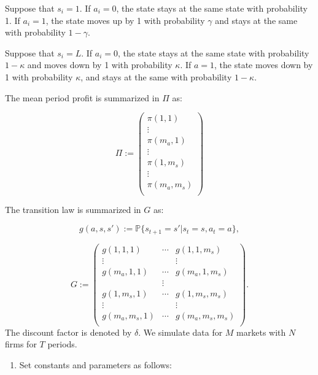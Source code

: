 \documentclass[]{book}
\providecommand{\tightlist}{%
  \setlength{\itemsep}{0pt}\setlength{\parskip}{0pt}}
\begin{document}
Suppose that \(s_i = 1\). If \(a_i = 0\), the state stays at the same
state with probability 1. If \(a_i = 1\), the state moves up by 1 with
probability \(\gamma\) and stays at the same with probability
\(1 - \gamma\).

Suppose that \(s_i = L\). If \(a_i = 0\), the state stays at the same
state with probability \(1 - \kappa\) and moves down by 1 with
probability \(\kappa\). If \(a = 1\), the state moves down by 1 with
probability \(\kappa\), and stays at the same with probability
\(1 - \kappa\).

The mean period profit is summarized in \(\Pi\) as:

\[
\Pi :=
\begin{pmatrix}
\pi(1, 1)\\
\vdots\\
\pi(m_a, 1)\\
\vdots \\
\pi(1, m_s)\\
\vdots\\
\pi(m_a, m_s)\\
\end{pmatrix}
\]

The transition law is summarized in \(G\) as:

\[
g(a, s, s') := \mathbb{P}\{s_{t + 1} = s'|s_t = s, a_t = a\},
\]

\[
G := 
\begin{pmatrix}
g(1, 1, 1) & \cdots & g(1, 1, m_s)\\
\vdots & & \vdots \\
g(m_a, 1, 1) & \cdots & g(m_a, 1, m_s)\\
& \vdots & \\
g(1, m_s, 1) & \cdots & g(1, m_s, m_s)\\
\vdots & & \vdots \\
g(m_a, m_s, 1) & \cdots & g(m_a, m_s, m_s)\\
\end{pmatrix}.
\] The discount factor is denoted by \(\delta\). We simulate data for
\(M\) markets with \(N\) firms for \(T\) periods.

\begin{enumerate}
\def\labelenumi{\arabic{enumi}.}
\tightlist
\item
  Set constants and parameters as follows:
\end{enumerate}
\end{document}
